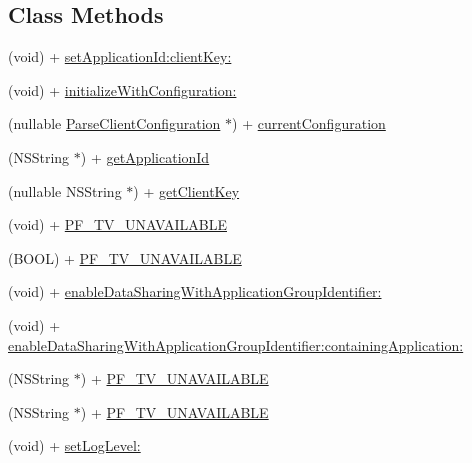 \subsection*{Class Methods}
\begin{DoxyCompactItemize}
\item 
(void) + \hyperlink{interface_parse_a2ab9fb9897adfeef2f15d2a4d17eedc5}{set\+Application\+Id\+:client\+Key\+:}
\begin{DoxyCompactList}\small\item\em 

 \end{DoxyCompactList}\item 
(void) + \hyperlink{interface_parse_a5a03444772235e4c7d62fb8c2dc12a04}{initialize\+With\+Configuration\+:}
\item 
(nullable \hyperlink{interface_parse_client_configuration}{Parse\+Client\+Configuration} $\ast$) + \hyperlink{interface_parse_afb3ecb775da799cfdf35b4e123a7f171}{current\+Configuration}
\item 
(N\+S\+String $\ast$) + \hyperlink{interface_parse_a2518969bfaf490a9e978fce7114401e3}{get\+Application\+Id}
\item 
(nullable N\+S\+String $\ast$) + \hyperlink{interface_parse_aa8cbb47db00f3180a8d84406ce16a7e1}{get\+Client\+Key}
\item 
(void) + \hyperlink{interface_parse_a72019d0929724fe9a66a7ce70ee5845d}{P\+F\+\_\+\+T\+V\+\_\+\+U\+N\+A\+V\+A\+I\+L\+A\+B\+L\+E}
\begin{DoxyCompactList}\small\item\em 

 \end{DoxyCompactList}\item 
(B\+O\+O\+L) + \hyperlink{interface_parse_aeba4206a1ffaf53d0335a28c12352a31}{P\+F\+\_\+\+T\+V\+\_\+\+U\+N\+A\+V\+A\+I\+L\+A\+B\+L\+E}
\item 
(void) + \hyperlink{interface_parse_a1410ebbcc67f5809e4ece8bb915c580d}{enable\+Data\+Sharing\+With\+Application\+Group\+Identifier\+:}
\begin{DoxyCompactList}\small\item\em 

 \end{DoxyCompactList}\item 
(void) + \hyperlink{interface_parse_aa442b96b5838e440db7b9fa4e93c1af7}{enable\+Data\+Sharing\+With\+Application\+Group\+Identifier\+:containing\+Application\+:}
\item 
(N\+S\+String $\ast$) + \hyperlink{interface_parse_af38a20d48d36d71026273cb005b48444}{P\+F\+\_\+\+T\+V\+\_\+\+U\+N\+A\+V\+A\+I\+L\+A\+B\+L\+E}
\item 
(N\+S\+String $\ast$) + \hyperlink{interface_parse_af38a20d48d36d71026273cb005b48444}{P\+F\+\_\+\+T\+V\+\_\+\+U\+N\+A\+V\+A\+I\+L\+A\+B\+L\+E}
\item 
(void) + \hyperlink{interface_parse_a2d0d1535297de00a85c1160ee217fb96}{set\+Log\+Level\+:}
\begin{DoxyCompactList}\small\item\em 


\end{DoxyCompactList}
\end{DoxyCompactItemize}
